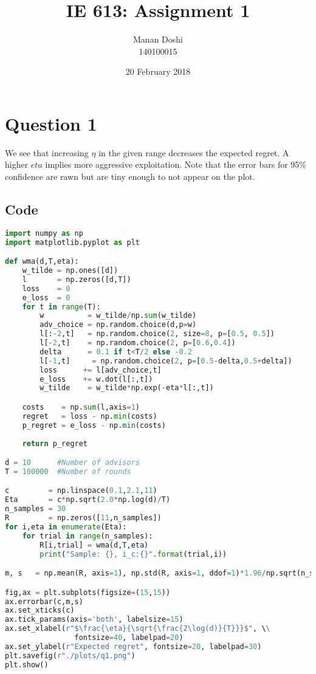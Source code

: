 \documentclass{article}
\title{IE 613: Assignment 1}
\author{Manan Doshi \\ 140100015}
\date{20 February 2018}
\begin{document}
\graphicspath{{./plots}}
\maketitle

\section*{Question 1}

We see that increasing $\eta$ in the given range decreases the expected regret. A higher $eta$ implies more aggressive exploitation. Note that the error bars for 95\% confidence are rawn but are tiny enough to not appear on the plot.

\subsection*{Code}
\begin{lstlisting}[language=python]
import numpy as np
import matplotlib.pyplot as plt

def wma(d,T,eta):
    w_tilde = np.ones([d])
    l       = np.zeros([d,T])
    loss    = 0
    e_loss  = 0
    for t in range(T):
        w          = w_tilde/np.sum(w_tilde)
        adv_choice = np.random.choice(d,p=w)
        l[:-2,t]   = np.random.choice(2, size=8, p=[0.5, 0.5])
        l[-2,t]    = np.random.choice(2, p=[0.6,0.4])
        delta      = 0.1 if t<T/2 else -0.2
        l[-1,t]     = np.random.choice(2, p=[0.5-delta,0.5+delta])
        loss      += l[adv_choice,t]
        e_loss    += w.dot(l[:,t])
        w_tilde    = w_tilde*np.exp(-eta*l[:,t])

    costs    = np.sum(l,axis=1) 
    regret   = loss - np.min(costs)
    p_regret = e_loss - np.min(costs)
    
    return p_regret

d = 10      #Number of advisors
T = 100000  #Number of rounds

c         = np.linspace(0.1,2.1,11)
Eta       = c*np.sqrt(2.0*np.log(d)/T)
n_samples = 30
R         = np.zeros([11,n_samples])
for i,eta in enumerate(Eta):
    for trial in range(n_samples):
        R[i,trial] = wma(d,T,eta)
        print("Sample: {}, i_c:{}".format(trial,i))

m, s   = np.mean(R, axis=1), np.std(R, axis=1, ddof=1)*1.96/np.sqrt(n_samples)

fig,ax = plt.subplots(figsize=(15,15))
ax.errorbar(c,m,s)
ax.set_xticks(c)
ax.tick_params(axis='both', labelsize=15)
ax.set_xlabel(r"$\frac{\eta}{\sqrt{\frac{2\log(d)}{T}}}$", \\
                fontsize=40, labelpad=20)
ax.set_ylabel(r"Expected regret", fontsize=20, labelpad=30)
plt.savefig(r"./plots/q1.png")
plt.show()
\end{lstlisting}
\newpage
\end{document}
